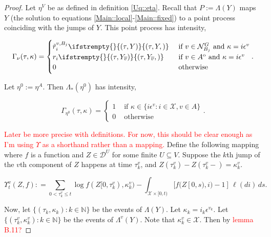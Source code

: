 \documentclass[12pt]{article}
\newcommand{\mb}{\mathbb}
\newcommand{\mc}{\mathcal}
\newcommand{\ov}{\overline}
\newcommand{\te}{\text}
\newcommand{\ep}{\epsilon}
\newcommand{\tr}{\textcolor{red}}
\newcommand{\defeq}{:=}								%
\newcommand{\cad}{\mc{D}}							%
\newcommand{\sta}{\mc{X}}							%
\newcommand{\gneigh}[2]{\mc{N}^{#1}_{#2}}			%
\newcommand{\cl}[1]{\ov{#1}}						%
\newcommand{\indx}[1]{^{#1}}						%
\newcommand{\Sm}{\ell}								%
\newcommand{\rate}{r}								%
\newcommand{\vind}[1]{_{#1}}						%
\newcommand{\tme}[1]{(#1)}							%
\newcommand{\tmi}[1]{#1}							%
\newcommand{\vpara}[1]{^{#1}}						%
\newcommand{\stpara}[1]{_{#1}}						%
\newcommand{\tpara}[1]{_{#1}}						%
\newcommand{\psf}{_*}								%
\newcommand{\tmepro}[3]{
\ifstrempty{#3}{
	\left(#1,#2\right)}{
	\left(#1,#2,#3\right)}}							%
\newcommand{\Xg}{Y}									%
\newcommand{\brate}{\alt{\rate}}					%
\newcommand{\inte}[1]{{#1}^\mathrm{o}}				%
\newcommand{\alt}[1]{\tilde{#1}}					%
\newcommand{\pmap}{\Lambda}							%
\newcommand{\rt}{\tau}								%
\renewcommand{\mark}{\kappa}						%
\newcommand{\ratee}{\Gamma}							%
\newcommand{\rp}{P}									%
\newcommand{\mm}{\nu}								%
\newcommand{\ev}[1]{\ep^{#1}}						%
\newcommand{\Xh}{Z}									%
\newcommand{\mmm}{\eta}								%
\newcommand{\ds}{\Upsilon}							%
\newcommand{\prc}[1]{_{#1}}							%
\renewcommand{\it}[1]{_{#1}}						%
\newcommand{\vjpara}[2]{^{#1,#2}}					%
\begin{document}
\begin{proof}
Let \(\mmm\vpara{V}\) be as defined in definition \ref{Uq::eta}. Recall that \(\rp\defeq \pmap(\Xg)\) maps \(\Xg\) (the solution to equations \eqref{Main::local}-\eqref{Main::fixed}) to a point process coinciding with the jumps of \(\Xg\). This point process has intensity,

\[\ratee\prc{\mm}(\rt,\mark) = \begin{cases}
\brate\vjpara{v}{B_j}\stpara{i}\tmepro{\rt}{\Xg}{} &\te{ if } v \in \gneigh{G}{B_j}\te{ and } \mark = i\ev{v}\\
\rate\stpara{i}\tmepro{\rt}{\Xg\vind{\cl{v}}}{} &\te{ if } v \in \inte{A}\te{ and } \mark = i\ev{v}\\
0 &\te{ otherwise}
\end{cases}.\]

Let \(\mmm\indx{0} \defeq \mmm\vpara{A}\). Then \(\pmap\psf(\mmm\indx{0})\) has intensity,

\[\ratee\prc{\mmm\indx{0}}(\rt,\mark) = 
\begin{cases}
1 &\te{ if } \mark\in  \{i\ev{v}: i \in \sta,v \in A\}\\
0 &\te{ otherwise}
\end{cases}.\]

\tr{Later be more precise with definitions. For now, this should be clear enough as I'm using \(\ds\) as a shorthand rather than a mapping.} Define the following mapping where \(f\) is a function and \(\Xh \in \cad\vpara{U}\) for some finite \(U \subseteq V\). Suppose the \(k\)th jump of the \(v\)th component of \(\Xh\) happens at time \(\rt\vpara{v}\it{k}\), and \(\Xh\tme{\rt\vpara{v}\it{k}} - \Xh\tme{\rt\vpara{v}\it{k}-} = \mark\vpara{v}\it{k}\). 

\begin{equation}
\ds\vpara{v}\tpara{t}(\Xh,f): = \sum_{0 < \rt\vpara{v}\it{k}\leq t} \log f(\Xh\tmi{[0,\rt\vpara{v}\it{k})},\mark\vpara{v}\it{k}) - \int_{\sta\times[0,t)} [f(\Xh\tmi{[0,s)},i) - 1]\,\Sm(di)\,ds.
\label{Uq::ds}
\end{equation}

Now, let \(\{(\rt\it{k},\mark\it{k}):k\in\mb{N}\}\) be the events of \(\pmap(\Xg)\). Let \(\mark\it{k} = i\it{k}\ev{v\it{k}}\). Let \(\{(\rt\it{k}\vpara{v},\mark\it{k}\vpara{v}):k\in\mb{N}\}\) be the events of \(\pmap\vpara{v}(\Xg)\). Note that \(\mark\it{k}\vpara{v} \in \sta\). Then by \tr{lemma B.11?}


\end{proof}
\end{document}
